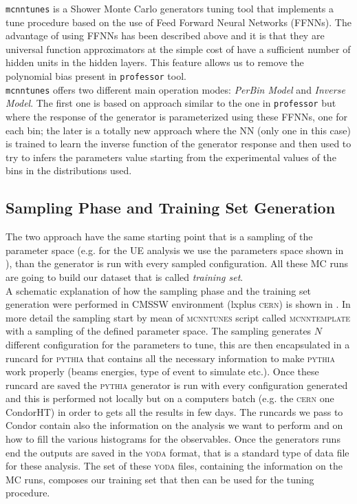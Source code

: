\texttt{mcnntunes} \cite{MCNNTUNESarticle} is a Shower Monte Carlo generators tuning tool that implements a tune procedure based on the use of Feed Forward Neural Networks (FFNNs). The advantage of using FFNNs has been described above and it is that they are universal function approximators at the simple cost of have a sufficient number of hidden units in the hidden layers. This feature allows us to remove the polynomial bias present in \texttt{professor} tool.
\\
\texttt{mcnntunes} offers two different main operation modes: \textit{PerBin Model} and \textit{Inverse Model}. The first one is based on approach similar to the one in \texttt{professor} but where the response of the generator is parameterized using these FFNNs, one for each bin; the later is a totally new approach where the NN (only one in this case) is trained to learn the inverse function of the generator response and then used to try to infers the parameters value starting from the experimental values of the bins in the distributions used.
\\

\medskip

\subsection{Sampling Phase and Training Set Generation}

The two approach have the same starting point that is a sampling of the parameter space (e.g. for the UE analysis we use the parameters space shown in ), than the generator is run with every sampled configuration. 
All these MC runs are going to build our dataset that is called \textit{training set}.
\\
A schematic explanation of how the sampling phase and the training set generation were performed in CMSSW environment (lxplus \textsc{cern}) is shown in . 
In more detail the sampling start by mean of \textsc{mcnntunes} script called \textsc{mcnntemplate} with a sampling of the defined parameter space. The sampling generates  $N$ different configuration for the parameters to tune, this are then encapsulated in a runcard for \textsc{pythia} that contains all the necessary information to make \textsc{pythia} work properly (beams energies, type of event to simulate etc.). Once these runcard are saved the \textsc{pythia} generator is run with every configuration generated and this is performed not locally but on a computers batch (e.g. the \textsc{cern} one CondorHT) in order to gets all the results in few days. The runcards we pass to Condor contain also the information on the analysis we want to perform and on how to fill the various histograms for the observables. Once the generators runs end the outputs are saved in the \textsc{yoda} format, that is a standard type of data file for these analysis. The set of these \textsc{yoda} files, containing the information on the MC runs, composes our training set that then can be used for the tuning procedure.

